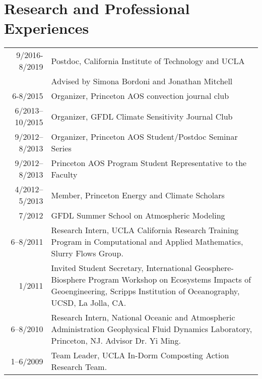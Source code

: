 \documentclass{article}
\begin{document}
\section*{Research and Professional Experiences}
\label{sec:orgheadline9}
\begin{center}
\begin{tabularx}{\textwidth}{rX}
9/2016-8/2019 & Postdoc, California Institute of Technology and UCLA\\
 & Advised by Simona Bordoni and Jonathan Mitchell\\
6-8/2015 & Organizer, Princeton AOS convection journal club\\
6/2013–10/2015 & Organizer, GFDL Climate Sensitivity Journal Club\\
9/2012–8/2013 & Organizer, Princeton AOS Student/Postdoc Seminar Series\\
9/2012–8/2013 & Princeton AOS Program Student Representative to the Faculty\\
4/2012–5/2013 & Member, Princeton Energy and Climate Scholars\\
7/2012 & GFDL Summer School on Atmospheric Modeling\\
6–8/2011 & Research Intern, UCLA California Research Training Program in Computational and Applied Mathematics, Slurry Flows Group.\\
1/2011 & Invited Student Secretary, International Geosphere-Biosphere Program Workshop on Ecosystems Impacts of Geoengineering, Scripps Institution of Oceanography, UCSD, La Jolla, CA.\\
6–8/2010 & Research Intern, National Oceanic and Atmospheric Administration Geophysical Fluid Dynamics Laboratory, Princeton, NJ. Advisor Dr. Yi Ming.\\
1–6/2009 & Team Leader, UCLA In-Dorm Composting Action Research Team.\\
\end{tabularx}
\end{center}
\end{document}
